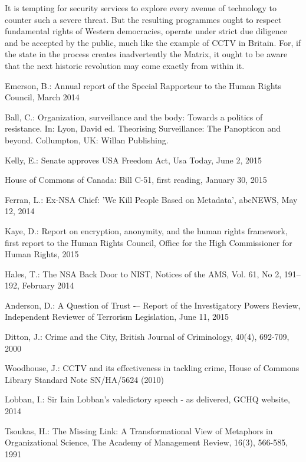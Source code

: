 \documentclass{llncs}
\begin{document}
It is tempting for security services to explore every avenue of technology to counter such a severe threat. But the resulting programmes ought to respect fundamental rights of Western democracies, operate under strict due diligence and be accepted by the public, much like the example of CCTV in Britain. For, if the state in the process creates inadvertently the Matrix, it ought to be aware that the next historic revolution may come exactly from within it.

%
%
\begin{thebibliography}{}
%
Emerson, B.:
Annual report of the Special Rapporteur to the Human Rights Council, March 2014

Ball, C.:
Organization, surveillance and the body: Towards a politics of resistance. In: Lyon, David ed. Theorising Surveillance: The Panopticon and beyond. Collumpton, UK: Willan Publishing. 

Kelly, E.:
Senate approves USA Freedom Act, Usa Today,  June 2, 2015

House of Commons of Canada:
Bill C-51, first reading, January 30, 2015

Ferran, L.:
Ex-NSA Chief: 'We Kill People Based on Metadata', abcNEWS, May 12, 2014

Kaye, D.:
Report on encryption, anonymity, and the human rights framework, first report to the Human Rights Council, Office for the High Commissioner for Human Rights, 2015

Hales, T.:
The NSA Back Door to NIST, Notices of the AMS, Vol. 61, No 2, 191--192, February 2014

Anderson, D.:
A Question of Trust -– Report of the Investigatory Powers Review, Independent Reviewer of Terrorism Legislation, June 11, 2015

Ditton, J.:
Crime and the City, British Journal of Criminology, 40(4), 692-709, 2000

Woodhouse, J.:
CCTV and its effectiveness in tackling crime, House of Commons Library Standard Note SN/HA/5624 (2010)

Lobban, I.:
Sir Iain Lobban's valedictory speech - as delivered, GCHQ website, 2014

Tsoukas, H.:
The Missing Link: A Transformational View of Metaphors in Organizational Science, The Academy of Management Review, 16(3), 566-585, 1991 


\end{thebibliography}
\end{document}
